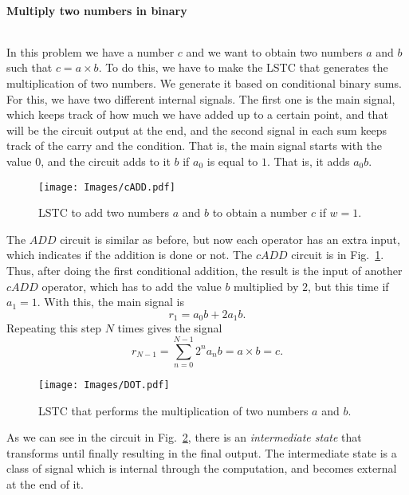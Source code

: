 \paragraph{Multiply two numbers in binary}
$ $

In this problem we have a number $c$ and we want to obtain two numbers $a$ and $b$ such that $c=a\times b$. To do this, we have to make the LSTC that generates the multiplication of two numbers. We generate it based on conditional binary sums. For this, we have two different internal signals. The first one is the main signal, which keeps track of how much we have added up to a certain point, and that will be the circuit output at the end, and the second signal in each sum keeps track of the carry and the condition. That is, the main signal starts with the value $0$, and the circuit adds to it $b$ if $a_0$ is equal to $1$. That is, it adds $a_0b$.
\begin{figure}
    \centering
    \texttt{[image: Images/cADD.pdf]}
    \caption{LSTC to add two numbers $a$ and $b$ to obtain a number $c$ if $w=1$.}
    \label{fig: cADD circuit}
\end{figure}

The $ADD$ circuit is similar as before, but now each operator has an extra input, which indicates if the addition is done or not. The $cADD$ circuit is in Fig.~\ref{fig: cADD circuit}. Thus, after doing the first conditional addition, the result is the input of another $cADD$ operator, which has to add the value $b$ multiplied by $2$, but this time if $a_1=1$. With this, the main signal is
\begin{equation}
    r_1 = a_0b + 2a_1b.
\end{equation}
Repeating this step $N$ times gives the signal
\begin{equation}
    r_{N-1} = \sum_{n=0}^{N-1} 2^n a_n b = a\times b=c.
\end{equation}

\begin{figure}
    \centering
    \texttt{[image: Images/DOT.pdf]}
    \caption{LSTC that performs the multiplication of two numbers $a$ and $b$.}
    \label{fig: DOT circuit}
\end{figure}
As we can see in the circuit in Fig.~\ref{fig: DOT circuit}, there is an \textit{intermediate state} that transforms until finally resulting in the final output. The intermediate state is a class of signal which is internal through the computation, and becomes external at the end of it.

